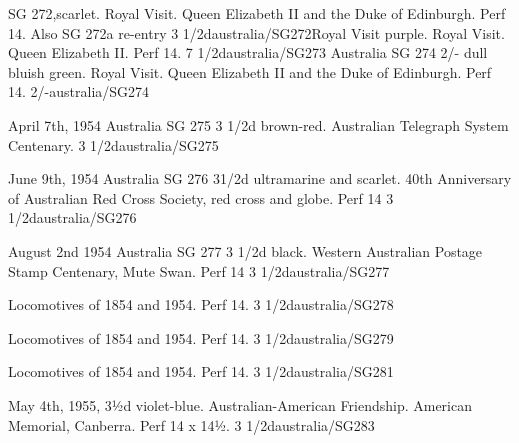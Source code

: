 %
{SG 272,scarlet. Royal Visit. Queen Elizabeth II and the Duke of Edinburgh. Perf 14. Also SG 272a re-entry}%
{3 1/2d}{australia/SG272}{Royal Visit}{}{}{}%
%
{purple. Royal Visit. Queen Elizabeth II. Perf 14.}%
{7 1/2d}{australia/SG273}{}{}{}{}%
%
{Australia SG 274 2/- dull bluish green. Royal Visit. Queen Elizabeth II and the Duke of Edinburgh. Perf 14.}%
{2/-}{australia/SG274}{}{}{}{}%

%
{April 7th, 1954 Australia SG 275 3 1/2d brown-red. Australian Telegraph System Centenary. \perf}%
{3 1/2d}{australia/SG275}{}{}{}{}

%
{June 9th, 1954 Australia SG 276 31/2d ultramarine and scarlet. 40th Anniversary of Australian Red Cross Society, red cross and globe. Perf 14}%
{3 1/2d}{australia/SG276}{}{}{}{}

%
{August 2nd 1954 Australia SG 277 3 1/2d black. Western Australian Postage Stamp Centenary, Mute Swan. Perf 14}%
{3 1/2d}{australia/SG277}{}{}{}{}

%
{Locomotives of 1854 and 1954. Perf 14.}%
{3 1/2d}{australia/SG278}{}{}{}{}

%
{Locomotives of 1854 and 1954. Perf 14.}%
{3 1/2d}{australia/SG279}{}{}{}{}

%
{Locomotives of 1854 and 1954. Perf 14.}%
{3 1/2d}{australia/SG281}{}{}{}{}


%
{May 4th, 1955,
3½d violet-blue. Australian-American Friendship. American Memorial, Canberra. Perf 14 x 14½.}%
{3 1/2d}{australia/SG283}{}{}{}{}

